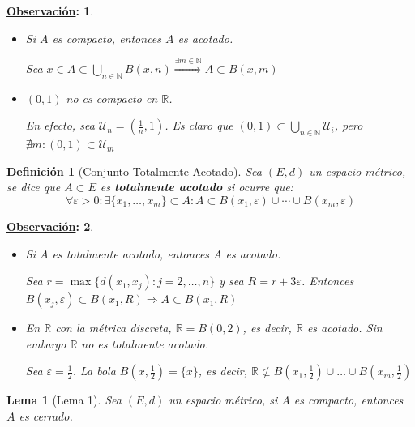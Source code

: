 \documentclass[10pt,a4paper,openright]{book}
\theoremstyle{break}
\newtheorem*{defi}{Definición}
\newtheorem*{lema}{Lema}
\newtheorem*{obs}{\underline{Observación}:}
\begin{document}
\newpage
\begin{obs}
\begin{itemize}
\item Si $A$ es compacto, entonces $A$ es acotado.

Sea $x \in A \subset \bigcup_{n \in \mathbb{N}} B(x,n) \stackrel{\exists m \in \mathbb{N}}{\Rightarrow} A \subset B(x,m)$

\item $(0,1)$ no es compacto en $\mathbb{R}$.

En efecto, sea $\mathcal{U}_n = (\frac{1}{n}, 1)$. Es claro que $(0,1) \subset \bigcup_{n \in \mathbb{N}} \mathcal{U}_i$, pero $\nexists m : (0,1) \subset \mathcal{U}_m$
\end{itemize}
\end{obs}

\begin{defi}[Conjunto Totalmente Acotado]
Sea $(E,d)$ un espacio métrico, se dice que $A \subset E$ es \textbf{totalmente acotado} si ocurre que:
$$\forall \varepsilon >0: \exists \{x_1, \ldots, x_m\} \subset A : A \subset B(x_1, \varepsilon) \cup \cdots \cup B(x_m, \varepsilon)$$
\end{defi}

\begin{obs}
\begin{itemize}
\item Si $A$ es totalmente acotado, entonces $A$ es acotado.

Sea $r = \max\{d(x_1, x_j) : j = 2, \ldots, n\}$ y sea $R= r + 3 \varepsilon$. Entonces $B(x_j, \varepsilon) \subset B(x_1, R) \Rightarrow A \subset B(x_1, R)$

\item En $\mathbb{R}$ con la métrica discreta, $\mathbb{R} = B(0,2)$, es decir, $\mathbb{R}$ es acotado. Sin embargo $\mathbb{R}$ no es totalmente acotado.

Sea $\varepsilon = \frac{1}{2}$. La bola $B(x, \frac{1}{2}) = \{x\}$, es decir, $\mathbb{R} \not\subset B(x_1, \frac{1}{2}) \cup \ldots \cup B(x_m, \frac{1}{2})$
\end{itemize}
\end{obs}

\begin{lema}[Lema 1]
Sea $(E,d)$ un espacio métrico, si $A$ es compacto, entonces $A$ es cerrado.
\end{lema}
\end{document}
